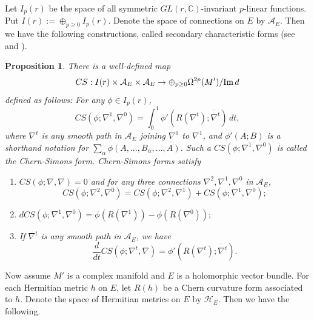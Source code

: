 \documentclass[12pt,reqno,a4paper]{amsart}
\numberwithin{equation}{section}
\def\a{\alpha}
\def\Im{{\rm Im\,}}
\newtheorem{prop}[theo]{{\sc Proposition}}
\theoremstyle{remark}
\theoremstyle{dotless}
\begin{document}
Let $I_p(r)$ be the space of all symmetric $GL(r,\mathbb{C})$-invariant $p$-linear functions. Put $I(r):=\oplus_{p\geq 0}I_p(r)$. Denote the space of connections on $E$ by $\mathcal{A}_E$. Then we have the following constructions, called secondary characteristic forms (see \cite{BC} and \cite{pingali2014bott}).
\begin{prop}\label{cs}
There is a well-defined map
\begin{equation*}
CS : I(r)\times \mathcal{A}_E \times \mathcal{A}_E \rightarrow \oplus_{p\geq0}\Omega^{2p}(M')/\Im d
\end{equation*}
defined as follows: For any $\phi\in I_p(r)$,
\begin{equation*}
CS(\phi;\nabla^1,\nabla^0)=\int_0^1 \phi'(R(\nabla^t);\dot{\nabla^t})\,dt,
\end{equation*}
where $\nabla^t$ is any smooth path in $\mathcal{A}_E$ joining $\nabla^0$ to $\nabla^1$, and $\phi'(A;B)$ is a shorthand notation for $\sum_\a \phi(A,...,B_\a,...,A)$. Such a $CS(\phi;\nabla^1,\nabla^0)$ is called the Chern-Simons form. Chern-Simons forms satisfy
\begin{enumerate}
    \item $CS(\phi;\nabla,\nabla)=0$ and for any three connections $\nabla^2, \nabla^1, \nabla^0$ in $\mathcal{A}_E$, 
    \begin{equation*}
CS(\phi;\nabla^2,\nabla^0)=CS(\phi;\nabla^2,\nabla^1)+CS(\phi;\nabla^1,\nabla^0) ;
    \end{equation*}
    \item $dCS(\phi;\nabla^1,\nabla^0)=\phi(R(\nabla^1))-\phi(R(\nabla^0)) ;$
    \item If $\nabla^t$ is any smooth path in $\mathcal{A}_E$, we have
    \begin{equation*}
\frac{d}{dt}CS(\phi;\nabla^t,\nabla)=\phi'(R(\nabla^t);\dot{\nabla^t}).
    \end{equation*}
\end{enumerate}
\end{prop}

Now assume $M'$ is a complex manifold and $E$ is a holomorphic vector bundle. For each Hermitian metric $h$ on $E$, let $R(h)$ be a Chern curvature form associated to $h$. Denote the space of Hermitian metrics on $E$ by $\mathcal{H}_E$. Then we have the following.
\end{document}
